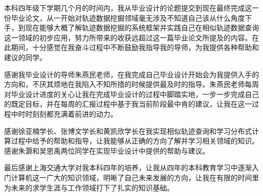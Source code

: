 \begin{thanks}
本科四年级下学期几个月的时间内，我从毕业设计的论题提交到现在最终完成这一份毕业论文，从一开始对轨迹数据挖掘领域毫无涉及不知道自己该从什么角度下手，到现在能够大概了解轨迹数据挖掘的系统框架并实践自己在相似轨迹数据查询这一领域的初步应用，努力所带来的收获远超过这一篇毕业论文所提及的内容。在此期间，十分感觉在我奋斗过程中不断鼓励我指导我的导师，为我提供各种帮助和建议的同学。

感谢我毕业设计的导师朱燕民老师，在我完成自己毕业设计开始会为我提供入手的方向和，不厌其烦地在我陷入不知所措的时候提供最及时的指导。朱燕民老师每周对毕业设计进度的关心让我在完成毕业设计的过程中脚踏实地，一步一步完成自己的既定目标，并在每周的汇报过程中基于我当前阶段最中肯的建议，让我在这一过程中时时刻刻都充满着前进的动力。

感谢徐亚楠学长、张博文学长和黄凯欣学长在我实现相似轨迹查询和学习分布式计算过程中给予的帮助和指导，让我能够从正确的方向了解并学习相关领域的知识。感谢朱灏和吴思禹两位同学在实现毕业设计中提供的帮助与建议。

最后感谢上海交通大学对我本科四年的培养，让我从四年的本科教育学习中逐渐入门计算机这一广大的知识领域，明晰了自己未来发展的方向，让我在有限的时间里为未来的求学生涯与工作领域打下了扎实的知识基础。



\end{thanks}
